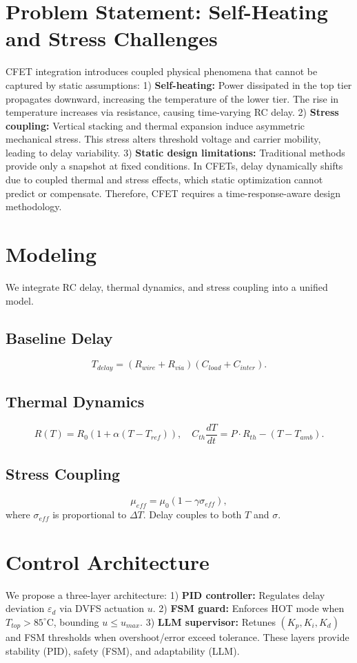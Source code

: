 \documentclass[conference]{IEEEtran}
\begin{document}
\section{Problem Statement: Self-Heating and Stress Challenges}
CFET integration introduces coupled physical phenomena that cannot be captured by static assumptions:  
1) \textbf{Self-heating:} Power dissipated in the top tier propagates downward, increasing the temperature of the lower tier. The rise in temperature increases via resistance, causing time-varying RC delay.  
2) \textbf{Stress coupling:} Vertical stacking and thermal expansion induce asymmetric mechanical stress. This stress alters threshold voltage and carrier mobility, leading to delay variability.  
3) \textbf{Static design limitations:} Traditional methods provide only a snapshot at fixed conditions. In CFETs, delay dynamically shifts due to coupled thermal and stress effects, which static optimization cannot predict or compensate.  
Therefore, CFET requires a time-response-aware design methodology.

\section{Modeling}
We integrate RC delay, thermal dynamics, and stress coupling into a unified model.  
\subsection{Baseline Delay}
\[
T_{delay} = (R_{wire} + R_{via})(C_{load} + C_{inter}).
\]
\subsection{Thermal Dynamics}
\[
R(T) = R_0 \left(1 + \alpha (T - T_{ref}) \right), \quad
C_{th}\frac{dT}{dt} = P\cdot R_{th} - (T - T_{amb}).
\]
\subsection{Stress Coupling}
\[
\mu_{eff} = \mu_0 (1 - \gamma \sigma_{eff}),
\]
where $\sigma_{eff}$ is proportional to $\Delta T$. Delay couples to both $T$ and $\sigma$.

\section{Control Architecture}
We propose a three-layer architecture:  
1) \textbf{PID controller:} Regulates delay deviation $\varepsilon_d$ via DVFS actuation $u$.  
2) \textbf{FSM guard:} Enforces HOT mode when $T_{top}>85^\circ$C, bounding $u \leq u_{max}$.  
3) \textbf{LLM supervisor:} Retunes $(K_p,K_i,K_d)$ and FSM thresholds when overshoot/error exceed tolerance.  
These layers provide stability (PID), safety (FSM), and adaptability (LLM).
\end{document}
